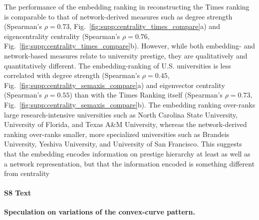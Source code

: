 \documentclass[12pt]{article} %
\begin{document}
The performance of the embedding ranking in reconstructing the Times ranking is comparable to that of network-derived measures such as degree strength (Spearman's $\rho = 0.73$, Fig.~\ref{fig:supp:centrality_times_compare}a) and eigencentrality centrality (Spearman's $\rho = 0.76$, Fig.~\ref{fig:supp:centrality_times_compare}b).
However, while both embedding- and network-based measures relate to university prestige, they are qualitatively and quantitatively different.
The embedding-ranking of U.S. universities is less correlated with degree strength (Spearman's $\rho = 0.45$, Fig.~\ref{fig:supp:centrality_semaxis_compare}a) and eigenvector  centrality (Spearman's $\rho = 0.55$) than with the Times Ranking itself (Spearman's $\rho = 0.73$, Fig.~\ref{fig:supp:centrality_semaxis_compare}b). 
The embedding ranking over-ranks large research-intensive universities such as North Carolina State University, University of Florida, and Texas A\&M University, whereas the network-derived ranking over-ranks smaller, more specialized universities such as Brandeis University, Yeshiva University, and University of San Francisco. 
This suggests that the embedding encodes information on prestige hierarchy at least as well as a network representation, but that the information encoded is something different from centrality


%
\paragraph*{S8 Text}
\label{si:text:boomerang_speculation}
{\bf Speculation on variations of the convex-curve pattern.}
\end{document}
